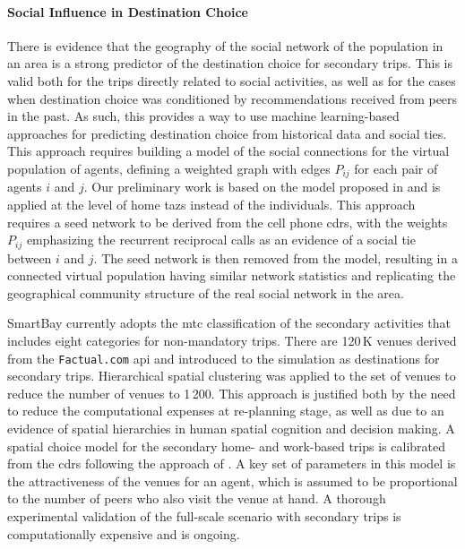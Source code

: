 \paragraph{Social Influence in Destination Choice}
There is evidence that the geography of the social network of the population in an area is a strong predictor of the destination choice for secondary trips. This is valid both for the trips directly related to social activities, as well as for the cases when destination choice was conditioned by recommendations received from peers in the past. As such, this provides a way to use machine learning-based approaches for predicting destination choice from historical data and social ties. This approach requires building a model of the social connections for the virtual population of agents, \ie defining a weighted graph with edges $P_{ij}$ for each pair of agents $i$ and $j$. Our preliminary work is based on the model proposed in \citet[][]{McGrathPozdnukhov_UrbComp_2014} and is applied at the level of home \glspl{taz} instead of the individuals. This approach requires a seed network to be derived from the cell phone \glspl{cdr}, with the weights $P_{ij}$ emphasizing the recurrent reciprocal calls as an evidence of a social tie between $i$ and $j$. The seed network is then removed from the model, resulting in a connected virtual population having similar network statistics and replicating the geographical community structure of the real social network in the area. 

SmartBay currently adopts the \gls{mtc} classification of the secondary activities that includes eight categories for non-mandatory trips. There are 120\,K venues derived from the \lstinline|Factual.com| \gls{api} and introduced to the simulation as destinations for secondary trips. Hierarchical spatial clustering was applied to the set of venues to reduce the number of venues to 1\,200. This approach is justified both by the need to reduce the computational expenses at re-planning stage, as well as due to an evidence of spatial hierarchies in human spatial cognition and decision making. A spatial choice model for the secondary home- and work-based trips is calibrated from the \glspl{cdr} following the approach of \citet[][]{McArdleEtAl_ACMTIS_2014}. A key set of parameters in this model is the attractiveness of the venues for an agent, which is assumed to be proportional to the number of peers who also visit the venue at hand. A thorough experimental validation of the full-scale scenario with secondary trips is computationally expensive and is ongoing.

